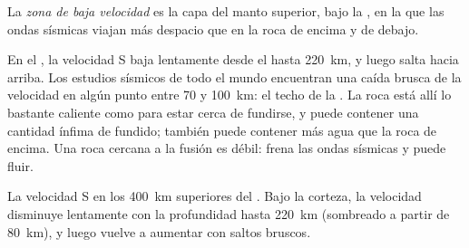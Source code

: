 \begin{definition}\label{def:g11:lithosphere-asthenosphere:lvz}
La \emph{zona de baja velocidad} es la capa del
manto superior, bajo la , en la que las ondas sísmicas viajan más
despacio que en la roca de encima y de debajo.
\end{definition}

En el , la velocidad S baja lentamente desde el
 hasta \qty{220}{km}, y luego salta hacia arriba. Los estudios sísmicos
de todo el mundo encuentran una caída brusca de la velocidad en algún punto
entre 70 y \qty{100}{km}: el techo de la . La roca está allí lo
bastante caliente como para estar cerca de fundirse, y puede contener una
cantidad ínfima de fundido; también puede contener más agua que la roca de
encima. Una roca cercana a la fusión es débil: frena las ondas sísmicas y
puede fluir.

\begin{omfigure}

{\small La velocidad S en los \qty{400}{km} superiores del . Bajo la corteza, la velocidad disminuye lentamente con la
profundidad hasta \qty{220}{km} (sombreado a partir de \qty{80}{km}), y luego
vuelve a aumentar con saltos bruscos.}
\end{omfigure}

